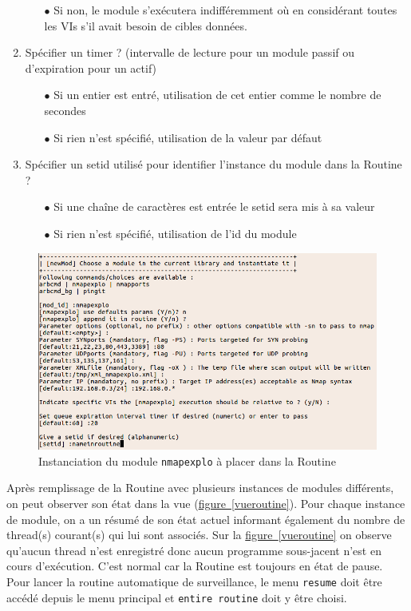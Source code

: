 \documentclass[]{article}
\newcommand{\wordlink}[2]{\hyperref[#1]{#2~\ref{#1}}}
\begin{document}
\begin{enumerate}
\begin{itemize}
	\item[$\bullet$] Si non, le module s'exécutera indifféremment où en considérant toutes les VIs s'il avait besoin de cibles données.
	\end{itemize}
\vspace{0.2cm}
\item Spécifier un timer ? (intervalle de lecture pour un module passif ou d'expiration pour un actif)
	\begin{itemize}
	\item[$\bullet$] Si un entier est entré, utilisation de cet entier comme le nombre de secondes
	\item[$\bullet$] Si rien n'est spécifié, utilisation de la valeur par défaut
	\end{itemize}
\vspace{0.2cm}
\item Spécifier un setid utilisé pour identifier l'instance du module dans la Routine ?
	\begin{itemize}
	\item[$\bullet$] Si une chaîne de caractères est entrée le setid sera mis à sa valeur
	\item[$\bullet$] Si rien n'est spécifié, utilisation de l'id du module
	\end{itemize}
\vspace{0.2cm}
\end{enumerate}

\begin{figure}[!ht]
\centering
     \includegraphics[width=0.8\linewidth]{newmod}
     \caption{Instanciation du module \texttt{nmapexplo} à placer dans la Routine}
     \label{newmod}
\end{figure}


Après remplissage de la Routine avec plusieurs instances de modules différents, on peut observer son état dans la vue (\wordlink{vueroutine}{figure}). Pour chaque instance de module, on a un résumé de son état actuel informant également du nombre de thread(s) courant(s) qui lui sont associés. Sur la \wordlink{vueroutine}{figure} on observe qu'aucun thread n'est enregistré donc aucun programme sous-jacent n'est en cours d'exécution. C'est normal car la Routine est toujours en état de pause. Pour lancer la routine automatique de surveillance, le menu \texttt{resume} doit être accédé depuis le menu principal et \texttt{entire routine} doit y être choisi. 
\end{document}
